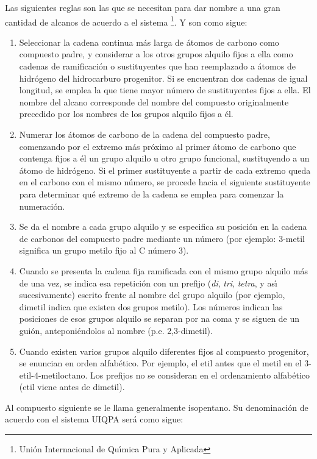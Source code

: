 Las siguientes reglas son las que se necesitan para dar
nombre a una gran cantidad de alcanos de acuerdo a el sistema
 \footnote{Uni\'on Internacional de Qu\'{\i}mica Pura y Aplicada}. Y
son como sigue:
\begin{enumerate}
\item Seleccionar la cadena continua m\'as larga de \'atomos de carbono como compuesto
padre, y considerar a los otros grupos alquilo fijos a ella como cadenas de
ramificaci\'on o sustituyentes que han reemplazado a \'atomos de hidr\'ogeno del
hidrocarburo progenitor. Si se encuentran dos cadenas de igual longitud, se emplea la
que tiene mayor n\'umero de sustituyentes fijos a ella. El nombre del alcano
corresponde del nombre del compuesto originalmente precedido por los nombres de los
grupos alquilo fijos a \'el.
\item Numerar los \'atomos de carbono de la cadena del compuesto padre, comenzando por el
extremo m\'as pr\'oximo al primer \'atomo de carbono que contenga fijos a \'el un grupo
alquilo u otro grupo funcional, sustituyendo a  un \'atomo de hidr\'ogeno. Si el primer
sustituyente a partir de cada extremo queda en el carbono con el mismo n\'umero, se
procede hacia el siguiente sustituyente para determinar qu\'e extremo de la cadena se
emplea para comenzar la numeraci\'on.
\item Se da el nombre a cada grupo alquilo y se especifica su posici\'on en la cadena
de carbonos del compuesto padre mediante un n\'umero (por ejemplo: 3-metil significa un
grupo metilo fijo al C n\'umero 3).
\item Cuando se presenta la cadena fija ramificada con el mismo grupo  alquilo m\'as de
una vez, se indica esa repetici\'on con un prefijo (\textit{di}, \textit{tri},
\textit{tetra}, y as\'{\i} sucesivamente) escrito frente  al nombre del grupo alquilo
(por ejemplo, dimetil indica que existen dos grupos metilo).  Los n\'umeros indican las
posiciones de esos grupos alquilo se separan por na coma y se siguen de un gui\'on,
anteponi\'endolos al nombre (p.e. 2,3-dimetil).
\item Cuando existen varios grupos alquilo diferentes fijos al compuesto progenitor, se
enuncian en orden alfab\'etico. Por ejemplo, el etil antes que el metil en el
3-etil-4-metiloctano. Los prefijos no se consideran en el ordenamiento alfab\'etico
(etil viene antes de dimetil).
\end{enumerate}

Al compuesto siguiente se le llama generalmente isopentano. Su denominaci\'on de
acuerdo con el sistema UIQPA ser\'a como sigue:

